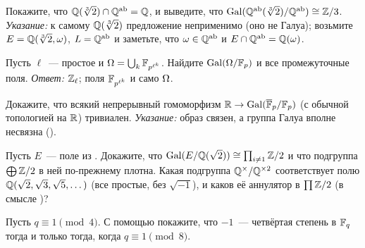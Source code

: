 \begin{exercise}[7-6]
Покажите, что $\mathbb Q(\sqrt[3]2)\cap\mathbb Q^{\mathrm{ab}}=\mathbb Q$, и выведите, что $\operatorname{Gal}(\mathbb Q^{\mathrm{ab}}(\sqrt[3]2)/\mathbb Q^{\mathrm{ab}})\cong\mathbb Z/3$. \emph{Указание:} к самому
$\mathbb Q(\sqrt[3]2)$ предложение  неприменимо (оно не Галуа); возьмите $E=\mathbb Q(\sqrt[3]2,\omega)$, $L=\mathbb Q^{\mathrm{ab}}$ и заметьте, что
$\omega\in\mathbb Q^{\mathrm{ab}}$ и $E\cap\mathbb Q^{\mathrm{ab}}=\mathbb Q(\omega)$.
\end{exercise}

\begin{exercise}[7-7]
Пусть $\ell$~--- простое и $\Omega=\bigcup_k\mathbb F_{p^{\ell^k}}$. Найдите $\operatorname{Gal}(\Omega/\mathbb F_p)$ и все промежуточные поля.
\emph{Ответ:} $\mathbb Z_\ell$; поля $\mathbb F_{p^{\ell^k}}$ и само $\Omega$.
\end{exercise}

\begin{exercise}[7-8]
Докажите, что всякий непрерывный гомоморфизм $\mathbb R\to\operatorname{Gal}(\overline{\mathbb F}_p/\mathbb F_p)$ (с обычной топологией на $\mathbb R$) тривиален.
\emph{Указание:} образ связен, а группа Галуа вполне несвязна ().
\end{exercise}

\begin{exercise}[7-9]
Пусть $E$~--- поле из . Докажите, что $\operatorname{Gal}(E/\mathbb Q(\sqrt2))\cong\prod_{i\ne1}\mathbb Z/2$ и что подгруппа $\bigoplus\mathbb Z/2$ в ней
по-прежнему плотна. Какая подгруппа $\mathbb Q^\times/\mathbb Q^{\times2}$ соответствует полю $\mathbb Q(\sqrt2,\sqrt3,\sqrt5,\dots)$ (все
простые, без $\sqrt{-1}$), и каков её аннулятор в $\prod\mathbb Z/2$ (в смысле )?
\end{exercise}

\begin{exercise}[7-10]
Пусть $q\equiv1\pmod4$. С помощью  покажите, что $-1$~--- четвёртая степень в $\mathbb F_q$ тогда и только тогда, когда
$q\equiv1\pmod8$.
\end{exercise}
